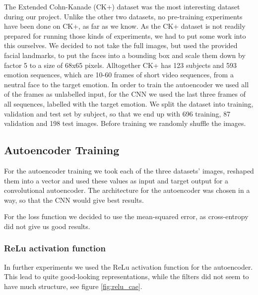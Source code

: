 \documentclass{article}
\begin{document}
      The Extended Cohn-Kanade (CK+) dataset \citep{kanade2000comprehensive,lucey2010extended} was the most interesting dataset during our project.
      Unlike the other two datasets, no pre-training experiments have been done on CK+, as far as we know.
      As the CK+ dataset is not readily prepared for running those kinds of experiments, we had to put some work into this ourselves.
      We decided to not take the full images, but used the provided facial landmarks, to put the faces into a bounding box and scale them down by factor 5 to a size of 68x65 pixels.
      Alltogether CK+ has 123 subjects and 593 emotion sequences, which are 10-60 frames of short video sequences, from a neutral face to the target emotion.
      In order to train the autoencoder we used all of the frames as unlabelled input, for the CNN we used the last three frames of all sequences, labelled with the target emotion.
      We split the dataset into training, validation and test set by subject, so that we end up with 696 training, 87 validation and 198 test images.
      Before training we randomly shuffle the images.

  \subsection{Autoencoder Training}
    For the autoencoder training we took each of the three datasets' images, reshaped them into a vector and used these values as input and target output for a convolutional autoencoder. The architecture for the autoencoder was chosen in a way, so that the CNN would give best results.

    For the loss function we decided to use the mean-squared error, as cross-entropy did not give us good results. %


    \subsubsection{ReLu activation function}
      In further experiments we used the ReLu activation function \citep{nair2010rectified} for the autoencoder.
      This lead to quite good-looking representations, while the filters did not seem to have much structure, see figure \ref{fig:relu_cae}.
\end{document}

